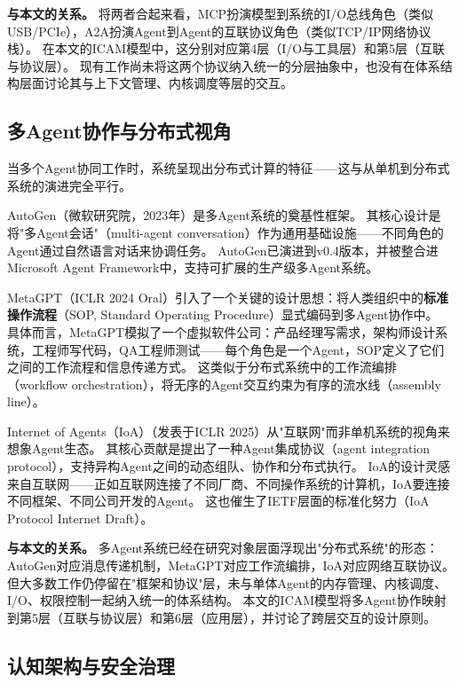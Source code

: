 \textbf{与本文的关系。}
将两者合起来看，MCP扮演模型到系统的I/O总线角色（类似USB/PCIe），A2A扮演Agent到Agent的互联协议角色（类似TCP/IP网络协议栈）。
在本文的ICAM模型中，这分别对应第4层（I/O与工具层）和第5层（互联与协议层）。
现有工作尚未将这两个协议纳入统一的分层抽象中，也没有在体系结构层面讨论其与上下文管理、内核调度等层的交互。

\subsection{多Agent协作与分布式视角}
\label{sec:related-multiagent}

当多个Agent协同工作时，系统呈现出分布式计算的特征——这与从单机到分布式系统的演进完全平行。

AutoGen\cite{wu2023autogen}（微软研究院，2023年）是多Agent系统的奠基性框架。
其核心设计是将"多Agent会话"（multi-agent conversation）作为通用基础设施——不同角色的Agent通过自然语言对话来协调任务。
AutoGen已演进到v0.4版本，并被整合进Microsoft Agent Framework中，支持可扩展的生产级多Agent系统。

MetaGPT\cite{metagpt2023}（ICLR 2024 Oral）引入了一个关键的设计思想：将人类组织中的\textbf{标准操作流程}（SOP, Standard Operating Procedure）显式编码到多Agent协作中。
具体而言，MetaGPT模拟了一个虚拟软件公司：产品经理写需求，架构师设计系统，工程师写代码，QA工程师测试——每个角色是一个Agent，SOP定义了它们之间的工作流程和信息传递方式。
这类似于分布式系统中的工作流编排（workflow orchestration），将无序的Agent交互约束为有序的流水线（assembly line）。

Internet of Agents（IoA）\cite{ioa2024}（发表于ICLR 2025）从"互联网"而非单机系统的视角来想象Agent生态。
其核心贡献是提出了一种Agent集成协议（agent integration protocol），支持异构Agent之间的动态组队、协作和分布式执行。
IoA的设计灵感来自互联网——正如互联网连接了不同厂商、不同操作系统的计算机，IoA要连接不同框架、不同公司开发的Agent。
这也催生了IETF层面的标准化努力（IoA Protocol Internet Draft）。

\textbf{与本文的关系。}
多Agent系统已经在研究对象层面浮现出"分布式系统"的形态：AutoGen对应消息传递机制，MetaGPT对应工作流编排，IoA对应网络互联协议。
但大多数工作仍停留在"框架和协议"层，未与单体Agent的内存管理、内核调度、I/O、权限控制一起纳入统一的体系结构。
本文的ICAM模型将多Agent协作映射到第5层（互联与协议层）和第6层（应用层），并讨论了跨层交互的设计原则。

\subsection{认知架构与安全治理}
\label{sec:related-cognition-security}

